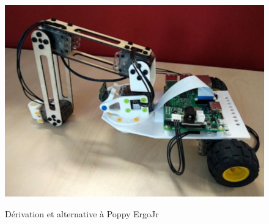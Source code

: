 \begin{figure}[!h]
\begin{minipage}{0.29\linewidth}
          \label{fig:Poppy-Starter}
        \end{minipage}
        \hfill
        \begin{minipage}{0.38\linewidth}
          \centering
          \includegraphics[width=\linewidth]{Figures/Poppy-dragster}
          \label{fig:Poppy-Dragster}
        \end{minipage}
        \caption{Dérivation et alternative à Poppy ErgoJr}
        \end{figure}
